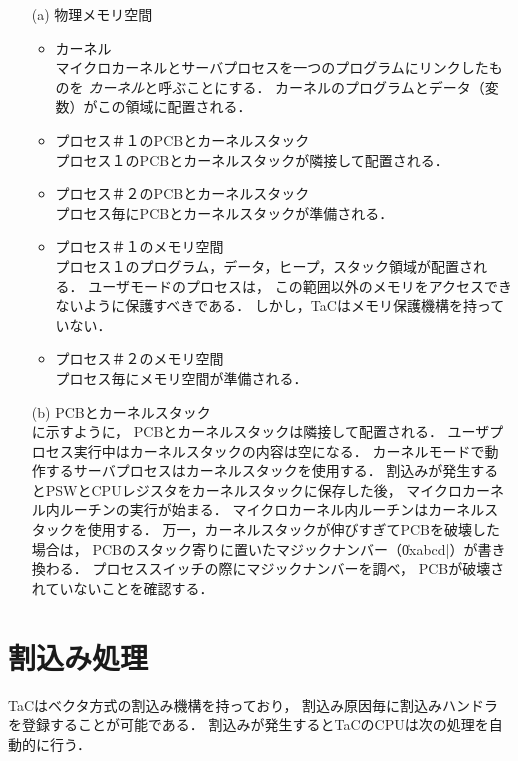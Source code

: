 \begin{enumerate}
\item[(a)] 物理メモリ空間
  \begin{itemize}
  \item カーネル \\
    マイクロカーネルとサーバプロセスを一つのプログラムにリンクしたものを
    \emph{カーネル}と呼ぶことにする．
    カーネルのプログラムとデータ（変数）がこの領域に配置される．
  \item プロセス＃１のPCBとカーネルスタック \\
    プロセス１のPCBとカーネルスタックが隣接して配置される．
  \item プロセス＃２のPCBとカーネルスタック \\
    プロセス毎にPCBとカーネルスタックが準備される．
  \item プロセス＃１のメモリ空間 \\
    プロセス１のプログラム，データ，ヒープ，スタック領域が配置される．
    ユーザモードのプロセスは，
    この範囲以外のメモリをアクセスできないように保護すべきである．
    しかし，TaCはメモリ保護機構を持っていない．
  \item プロセス＃２のメモリ空間 \\
    プロセス毎にメモリ空間が準備される．
  \end{itemize}
\item[(b)] PCBとカーネルスタック \\
  に示すように，
  PCBとカーネルスタックは隣接して配置される．
  ユーザプロセス実行中はカーネルスタックの内容は空になる．
  カーネルモードで動作するサーバプロセスはカーネルスタックを使用する．
  割込みが発生するとPSWとCPUレジスタをカーネルスタックに保存した後，
  マイクロカーネル内ルーチンの実行が始まる．
  マイクロカーネル内ルーチンはカーネルスタックを使用する．
  万一，カーネルスタックが伸びすぎてPCBを破壊した場合は，
  PCBのスタック寄りに置いたマジックナンバー（\|0xabcd|）が書き換わる．
  プロセススイッチの際にマジックナンバーを調べ，
  PCBが破壊されていないことを確認する．
\end{enumerate}

\section{割込み処理}
\label{tacosInterrupt}
TaCはベクタ方式の割込み機構を持っており，
割込み原因毎に割込みハンドラを登録することが可能である．
割込みが発生するとTaCのCPUは次の処理を自動的に行う．

